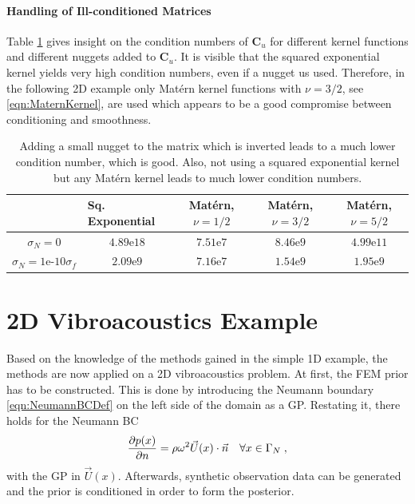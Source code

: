 \documentclass[%
  a4paper,oneside,%
  11pt,%
  smallchapters,
  style=printdev,
  extramargin,
  green,%
  rgb, <cmyk>
  ]{tubsbook}
\begin{document}
\paragraph{Handling of Ill-conditioned Matrices}
Table \ref{tab:Conditioning} gives insight on the condition numbers of $\bm{C}_u$ for different kernel functions and different nuggets added to $\bm{C}_u$. It is visible that the squared exponential kernel yields very high condition numbers, even if a nugget us used. Therefore, in the following 2D example only Mat\'ern kernel functions with $\nu=3/2$, see \eqref{eqn:MaternKernel}, are used which appears to be a good compromise between conditioning and smoothness.
\begin{table}[!ht]
\centering
\caption{Adding a small nugget to the matrix which is inverted leads to a much lower condition number, which is good. Also, not using a squared exponential kernel but any Mat\'ern kernel leads to much lower condition numbers.}
\label{tab:Conditioning}
\begin{tabular}{@{}ccccc@{}}
\toprule
                                  & \multicolumn{1}{l}{Sq. Exponential} & Mat\'ern, $\nu = 1/2$ & Mat\'ern, $\nu = 3/2$ & Mat\'ern, $\nu = 5/2$ \\ \midrule
$\sigma_N = 0$                    & $4.89\text{e}18$                        & $7.51\text{e}7$                       & $8.46\text{e}9$                       & $4.99\text{e}11$                      \\
$\sigma_N = 1\text{e-}10\sigma_f$ & $2.09\text{e}9$                         & $7.16\text{e}7$                       & $1.54\text{e}9$                       & $1.95\text{e}9$                       \\ \bottomrule
\end{tabular}
\end{table}
\FloatBarrier

\section{2D Vibroacoustics Example}
Based on the knowledge of the methods gained in the simple 1D example, the methods are now applied on a 2D vibroacoustics problem. At first, the FEM prior has to be constructed. This is done by introducing the Neumann boundary \eqref{eqn:NeumannBCDef} on the left side of the domain as a GP. Restating it, there holds for the Neumann BC
\begin{equation}
\pdv{p(x)}{n} = \rho \omega^2 \vec{U}(x) \cdot \vec{n} \quad \forall x \in \Gamma_N \;,
\end{equation}
with the GP in $\vec{U}(x)$.
Afterwards, synthetic observation data can be generated and the prior is conditioned in order to form the posterior.
\end{document}
